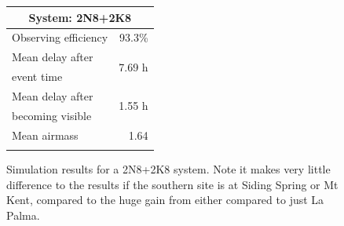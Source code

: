 \begin{colsection}
\begin{colsection}
\begin{figure}[p]
\begin{center}
\begin{minipage}[t]{0.35\textwidth}
\begin{tabular}{lr}
\multicolumn{2}{c}{\textbf{System: 2N8+2K8}} \\
\midrule
Observing efficiency & 93.3\% \\
\midrule
Mean delay after     & \multirow{2}{*}{7.69 h} \\
event time           & \\
Mean delay after     & \multirow{2}{*}{1.55 h} \\
becoming visible     & \\
\midrule
Mean airmass         & 1.64 \\
& \\
\end{tabular}
\vfill
\end{minipage}

\end{center}
\caption[Simulation results: 2N8+2K8 system]{Simulation results for a 2N8+2K8 system. Note it makes very little difference to the results if the southern site is at Siding Spring or Mt Kent, compared to the huge gain from either compared to just La Palma.
}
\label{fig:sim_2n8+2k8}
\end{figure}


\clearpage

\begin{table}[t]
\begin{center}
\begin{tabular}{c|cccc|c|cc|c} %


\end{tabular}
\end{center}
\end{table}
\end{colsection}
\end{colsection}
